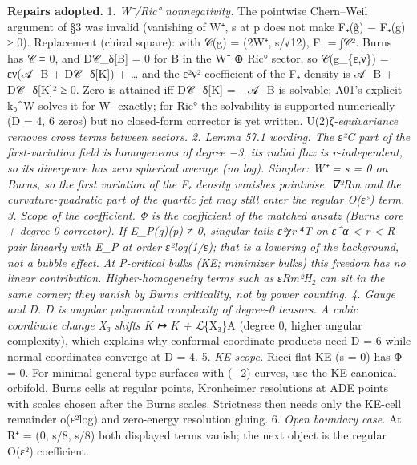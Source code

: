 \documentclass[
  10pt,
]{report}
\begin{document}
\textbf{Repairs adopted.} 1. \emph{W⁻/Ric° nonnegativity.} The pointwise
Chern--Weil argument of §3 was invalid (vanishing of W⁺, s at p does not
make F₊(g̃) − F₊(g) ≥ 0). Replacement (chiral square): with 𝒞(g) = (2W⁺,
s/√12), F₊ = ∫\textbar 𝒞\textbar². Burns has 𝒞 ≡ 0, and D𝒞\_δ{[}B{]} = 0
for B in the W⁻ ⊕ Ric° sector, so 𝒞(g\_\{ε,ν\}) = εν(𝒜\_B +
D𝒞\_δ{[}K{]}) + \ldots{} and the ε²ν² coefficient of the F₊ density is
\textbar 𝒜\_B + D𝒞\_δ{[}K{]}\textbar² ≥ 0. Zero is attained iff
D𝒞\_δ{[}K{]} = −𝒜\_B is solvable; A01's explicit k₀\^{}W solves it for
W⁻ exactly; for Ric° the solvability is supported numerically (D = 4, 6
zeros) but no closed-form corrector is yet written.
U(2)\emph{ζ-equivariance removes cross terms between sectors. 2.
\emph{Lemma 57.1 wording.} The ε²C part of the first-variation field is
homogeneous of degree −3, its radial flux is r-independent, so its
divergence has zero spherical average (no log). Simpler: W⁺ = s = 0 on
Burns, so the first variation of the F₊ density vanishes pointwise. ∇²Rm
and the curvature-quadratic part of the quartic jet may still enter the
regular O(ε²) term. 3. \emph{Scope of the coefficient.} Φ is the
coefficient of the matched ansatz (Burns core + degree-0 corrector). If
E\_P(g)(p) ≠ 0, singular tails ε²χr⁻⁴T on ε\^{}α \textless{} r
\textless{} R pair linearly with E\_P at order ε²log(1/ε); that is a
lowering of the background, not a bubble effect. At P-critical bulks
(KE; minimizer bulks) this freedom has no linear contribution.
Higher-homogeneity terms such as εRm²H₂ can sit in the same corner; they
vanish by Burns criticality, not by power counting. 4. \emph{Gauge and
D.} D is angular polynomial complexity of degree-0 tensors. A cubic
coordinate change X₃ shifts K ↦ K + ℒ}\{X₃\}A (degree 0, higher angular
complexity), which explains why conformal-coordinate products need D = 6
while normal coordinates converge at D = 4. 5. \emph{KE scope.}
Ricci-flat KE (s = 0) has Φ = 0. For minimal general-type surfaces with
(−2)-curves, use the KE canonical orbifold, Burns cells at regular
points, Kronheimer resolutions at ADE points with scales chosen after
the Burns scales. Strictness then needs only the KE-cell remainder
o(ε²log) and zero-energy resolution gluing. 6. \emph{Open boundary
case.} At R⁺ = (0, s/8, s/8) both displayed terms vanish; the next
object is the regular O(ε²) coefficient.
\end{document}
